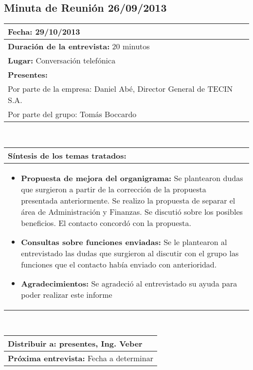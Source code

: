 \subsection{Minuta de Reunión 26/09/2013}
\begin{flushleft}
	\begin{tabular}{|p{15cm}|}
		\hline
		\textbf{Fecha:} 29/10/2013 \\ \hline
		\textbf{Duración de la entrevista:} 20 minutos\\ \hline
		\textbf{Lugar:} Conversación telefónica\\ \hline
		\textbf{Presentes:} \\
			Por parte de la empresa: Daniel Abé, Director General de TECIN S.A. \\ 
			Por parte del grupo: Tomás Boccardo \\ \hline
	\end{tabular}  \\
	\vspace{0.7cm}
	\begin{tabular}{|p{15cm}|}
		\hline
		\textbf{Síntesis de los temas tratados:}\\
		\hline
		\begin{itemize}
			\item \textbf{Propuesta de mejora del organigrama:}
			Se plantearon dudas que surgieron a partir de la corrección de la propuesta presentada anteriormente. Se realizo la propuesta de separar el área de Administración y Finanzas. Se discutió sobre los posibles beneficios. El contacto concordó con la propuesta.

		\item \textbf{Consultas sobre funciones enviadas:} 
		Se le plantearon al entrevistado las dudas que surgieron al discutir con el grupo las funciones que el contacto había enviado con anterioridad.

		\item \textbf{Agradecimientos:} Se agradeció al entrevistado su ayuda para poder realizar este informe

		\end{itemize} \\ \hline
	\end{tabular} \\
	\vspace{0.7cm}
	\begin{tabular}{|p{15cm}|}                
		\hline 
		\textbf{Distribuir a:} presentes, Ing. Veber\\
		\hline
		\textbf{Próxima entrevista:} Fecha a determinar\\
		\hline
	\end{tabular}	
	
\end{flushleft}